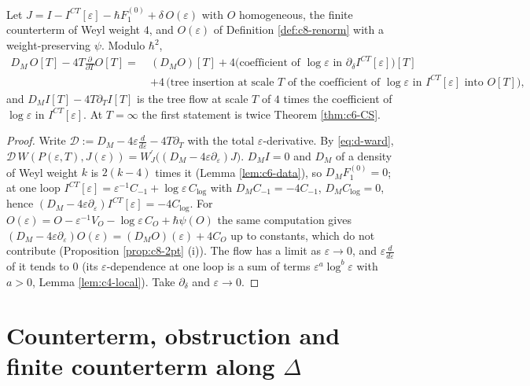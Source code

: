 \begin{corollary}
\label{cor:d-CS}
Let $J=I-I^{CT}[\varepsilon]-\hbar F_1^{(0)}+\delta\,O(\varepsilon)$ with $O$ homogeneous, the finite counterterm of Weyl weight $4$, and $O(\varepsilon)$ of Definition \ref{def:c8-renorm} with a weight-preserving $\psi$. Modulo $\hbar^2$,
\[
\begin{aligned}
D_M\,O[T]-4T\frac{\partial}{\partial T}O[T]=\ &(D_MO)[T]+4\big(\text{coefficient of }\log\varepsilon\text{ in }\partial_\delta I^{CT}[\varepsilon]\big)[T]\\
&+4\,\big(\text{tree insertion at scale }T\text{ of the coefficient of }\log\varepsilon\text{ in }I^{CT}[\varepsilon]\text{ into }O[T]\big),
\end{aligned}
\]
and $D_MI[T]-4T\partial_TI[T]$ is the tree flow at scale $T$ of $4$ times the coefficient of $\log\varepsilon$ in $I^{CT}[\varepsilon]$. At $T=\infty$ the first statement is twice Theorem \ref{thm:c6-CS}.
\end{corollary}

\begin{proof}
Write $\mathcal D:=D_M-4\varepsilon\frac{d}{d\varepsilon}-4T\partial_T$ with the total $\varepsilon$-derivative. By \eqref{eq:d-ward}, $\mathcal D\,W(P(\varepsilon,T),J(\varepsilon))=W^{\prime}_J\big((D_M-4\varepsilon\partial_\varepsilon)J\big)$. $D_MI=0$ and $D_M$ of a density of Weyl weight $k$ is $2(k-4)$ times it (Lemma \ref{lem:c6-data}), so $D_MF_1^{(0)}=0$; at one loop $I^{CT}[\varepsilon]=\varepsilon^{-1}C_{-1}+\log\varepsilon\,C_{\log}$ with $D_MC_{-1}=-4C_{-1}$, $D_MC_{\log}=0$, hence $(D_M-4\varepsilon\partial_\varepsilon)I^{CT}[\varepsilon]=-4C_{\log}$. For $O(\varepsilon)=O-\varepsilon^{-1}V_O-\log\varepsilon\,C_O+\hbar\psi(O)$ the same computation gives $(D_M-4\varepsilon\partial_\varepsilon)O(\varepsilon)=(D_MO)(\varepsilon)+4C_O$ up to constants, which do not contribute (Proposition \ref{prop:c8-2pt} (i)). The flow has a limit as $\varepsilon\to0$, and $\varepsilon\frac{d}{d\varepsilon}$ of it tends to $0$ (its $\varepsilon$-dependence at one loop is a sum of terms $\varepsilon^a\log^b\varepsilon$ with $a>0$, Lemma \ref{lem:c4-local}). Take $\partial_\delta$ and $\varepsilon\to0$.
\end{proof}

\section{Counterterm, obstruction and finite counterterm along $\Delta$}

